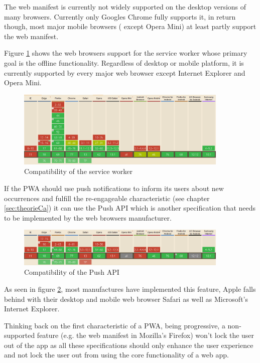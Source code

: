 The web manifest is currently not widely supported on the desktop versions of many browsers. Currently only Googles Chrome fully supports it, in return though, most major mobile browsers ( except Opera Mini) at least partly support the web manifest. 

Figure \ref{fig:pwacompatibilityserviceworker} shows the web browsers support for the service worker whose primary goal is the offline functionality. Regardless of desktop or mobile platform, it is currently supported by every major web browser except Internet Explorer and Opera Mini.

\begin{figure}[htbp] 
	\centering
	\includegraphics[width=0.9\textwidth]{Assets/chapter_pwa/serviceworkersupport.PNG}
	\caption{Compatibility of the service worker}
	\label{fig:pwacompatibilityserviceworker}
\end{figure}

If the PWA should use push notifications to inform its users about new occurrences and fulfill the re-engageable characteristic (see chapter \ref{sec:theorieCa}) it can use the Push API which is another specification that needs to be implemented by the web browsers manufacturer.

\begin{figure}[htbp] 
	\centering
	\includegraphics[width=0.9\textwidth]{Assets/chapter_pwa/pushapisupport.PNG}
	\caption{Compatibility of the Push API}
	\label{fig:pwacompatibilitypushapi}
\end{figure}

As seen in figure \ref{fig:pwacompatibilitypushapi}, most manufactures have implemented this feature, Apple falls behind with their desktop and mobile web browser Safari as well as Microsoft’s Internet Explorer.

Thinking back on the first characteristic of a PWA, being progressive, a non-supported feature (e.g. the web manifest in Mozilla's Firefox) won’t lock the user out of the app as all these specifications should only enhance the user experience and not lock the user out from using the core functionality of a web app.